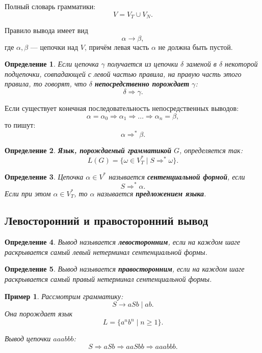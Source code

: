 \documentclass[12pt,a4paper]{article}
\newtheorem{definition}{Определение}
\newtheorem{example}{Пример}
\newcommand{\derives}{\Rightarrow}
\newcommand{\derivesstar}{\Rightarrow^{*}}
\begin{document}
Полный словарь грамматики:
\[
V=V_T\cup V_N.
\]

Правило вывода имеет вид
\[
\alpha\to\beta,
\]
где $\alpha,\beta$ --- цепочки над $V$, причём левая часть $\alpha$ не должна быть пустой.

\begin{definition}
Если цепочка $\gamma$ получается из цепочки $\delta$ заменой в $\delta$ некоторой подцепочки, совпадающей с левой частью правила, на правую часть этого правила, то говорят, что $\delta$ \textbf{непосредственно порождает} $\gamma$:
\[
\delta\derives \gamma.
\]
\end{definition}

Если существует конечная последовательность непосредственных выводов:
\[
\alpha=\alpha_0\derives \alpha_1\derives \ldots \derives \alpha_n=\beta,
\]
то пишут:
\[
\alpha\derivesstar \beta.
\]

\begin{definition}
\textbf{Язык, порождаемый грамматикой} $G$, определяется так:
\[
L(G)=\{\omega\in V_T^*\mid S\derivesstar \omega\}.
\]
\end{definition}

\begin{definition}
Цепочка $\alpha\in V^*$ называется \textbf{сентенциальной формой}, если
\[
S\derivesstar \alpha.
\]
Если при этом $\alpha\in V_T^*$, то $\alpha$ называется \textbf{предложением языка}.
\end{definition}

\subsection{Левосторонний и правосторонний вывод}

\begin{definition}
Вывод называется \textbf{левосторонним}, если на каждом шаге раскрывается самый левый нетерминал сентенциальной формы.
\end{definition}

\begin{definition}
Вывод называется \textbf{правосторонним}, если на каждом шаге раскрывается самый правый нетерминал сентенциальной формы.
\end{definition}

\begin{example}
Рассмотрим грамматику:
\[
S\to aSb\mid ab.
\]
Она порождает язык
\[
L=\{a^n b^n\mid n\ge 1\}.
\]

Вывод цепочки $aaabbb$:
\[
S\derives aSb\derives aaSbb\derives aaabbb.
\]
\end{example}
\end{document}

